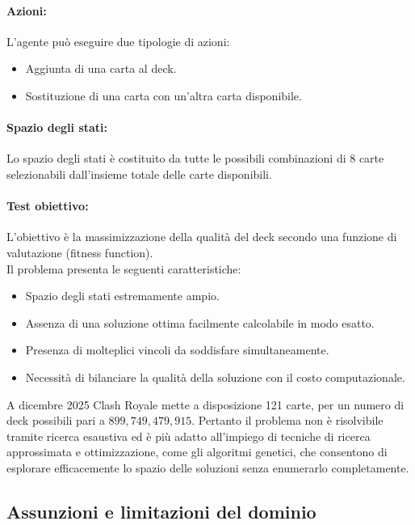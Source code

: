 \documentclass{article}
\begin{document}
\paragraph{Azioni:}
L’agente può eseguire due tipologie di azioni:
\begin{itemize}
    \item Aggiunta di una carta al deck.
    \item Sostituzione di una carta con un’altra carta disponibile.
\end{itemize}

\paragraph{Spazio degli stati:}
Lo spazio degli stati è costituito da tutte le possibili combinazioni di 8 carte selezionabili dall’insieme totale delle carte disponibili.

\paragraph{Test obiettivo:}
L’obiettivo è la massimizzazione della qualità del deck secondo una funzione di valutazione (fitness function).\\


Il problema presenta le seguenti caratteristiche:
\begin{itemize}
    \item Spazio degli stati estremamente ampio.
    \item Assenza di una soluzione ottima facilmente calcolabile in modo esatto.
    \item Presenza di molteplici vincoli da soddisfare simultaneamente.
    \item Necessità di bilanciare la qualità della soluzione con il costo computazionale.
\end{itemize}

A dicembre 2025 Clash Royale mette a disposizione 121 carte, per un numero di deck possibili pari a $899{,}749{,}479{,}915$.
Pertanto il problema non è risolvibile tramite ricerca esaustiva ed è più adatto all’impiego di tecniche di ricerca approssimata e ottimizzazione, come gli algoritmi genetici, che consentono di esplorare efficacemente lo spazio delle soluzioni senza enumerarlo completamente.

\subsection{Assunzioni e limitazioni del dominio}
\end{document}
